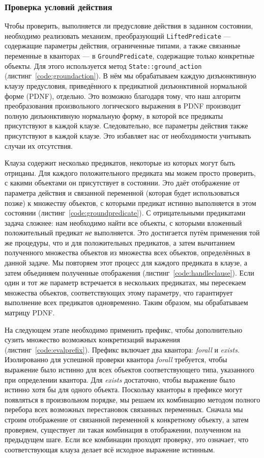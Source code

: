 \documentclass{article}
\begin{document}
\subsubsection{Проверка условий действия}

Чтобы проверить, выполняется ли предусловие действия в заданном состоянии,
необходимо реализовать механизм, преобразующий \texttt{LiftedPredicate}
--- содержащие параметры действия, ограниченные типами,
а также связанные переменные в кванторах ---
в \texttt{GroundPredicate}, содержащие только конкретные объекты.
Для этого используется метод \texttt{State::ground\_action} (листинг~\ref{code:groundaction}).
В нём мы обрабатываем каждую дизъюнктивную клаузу предусловия,
приведённого к предикатной дизъюнктивной нормальной форме (PDNF), отдельно.
Это возможно благодаря тому, что наш алгоритм преобразования произвольного логического выражения в PDNF
производит полную дизъюнктивную нормальную форму, в которой все предикаты присутствуют в каждой клаузе.
Следовательно, все параметры действия также присутствуют в каждой клаузе.
Это избавляет нас от необходимости учитывать случаи их отсутствия.

Клауза содержит несколько предикатов, некоторые из которых могут быть отрицаны.
Для каждого положительного предиката мы можем просто проверить,
с какими объектами он присутствует в состоянии.
Это даёт отображение от параметра действия и связанной переменной (которая будет использоваться позже) к множеству объектов,
с которыми предикат истинно выполняется в этом состоянии (листинг~\ref{code:groundpredicate}).
С отрицательными предикатами задача сложнее: нам необходимо найти все объекты, с которыми вложенный положительный предикат \textit{не} выполняется.
Это достигается путём применения той же процедуры, что и для положительных предикатов,
а затем вычитанием полученного множества объектов из множества всех объектов, определённых в данной задаче.
Мы повторяем этот процесс для каждого предиката в клаузе, а затем объединяем полученные отображения (листинг~\ref{code:handleclause}).
Если один и тот же параметр встречается в нескольких предикатах,
мы пересекаем множества объектов, соответствующих этому параметру, что гарантирует выполнение всех предикатов одновременно.
Таким образом, мы обрабатываем матрицу PDNF.

На следующем этапе необходимо применить префикс,
чтобы дополнительно сузить множество возможных конкретизаций выражения (листинг~\ref{code:evalprefix}).
Префикс включает два квантора: \textit{forall} и \textit{exists}.
Изолированно для успешной проверки квантора \textit{forall} требуется,
чтобы выражение было истинно для всех объектов соответствующего типа, указанного при определении квантора.
Для \textit{exists} достаточно, чтобы выражение было истинно хотя бы для одного объекта.
Поскольку кванторы в префиксе могут появляться в произвольном порядке,
мы решаем их комбинацию методом полного перебора всех возможных перестановок связанных переменных.
Сначала мы строим отображение от связанной переменной к конкретному объекту,
а затем проверяем, существует ли такая комбинация в отображении, полученном на предыдущем шаге.
Если все комбинации проходят проверку, это означает, что соответствующая клауза делает всё исходное выражение истинным.
\end{document}

